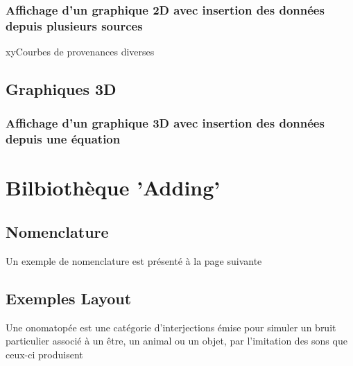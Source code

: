 

\subsection{Affichage d'un graphique 2D avec insertion des données depuis plusieurs sources}


\begin{graphic}{0.8}{0.4}{0}{20}{-1}{10}{x}{y}{Courbes de provenances diverses}
\end{graphic}


\section{Graphiques 3D}

\subsection{Affichage d'un graphique 3D avec insertion des données depuis une équation}


\chapter{Bilbiothèque 'Adding'}

\section{Nomenclature}

Un exemple de nomenclature est présenté à la page suivante
\section{Exemples Layout}


Une onomatopée est une catégorie d'interjections
émise pour simuler un bruit particulier associé à un être,
un animal ou un objet, par l'imitation des sons que ceux-ci produisent


\printnomenclature
{}

\printindex 
{}

